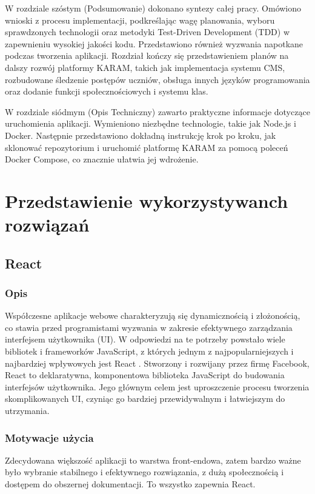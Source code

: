 \documentclass[shortabstract,inz]{iithesis}
\begin{document}
W rozdziale szóstym (Podsumowanie) dokonano syntezy całej pracy. Omówiono wnioski z procesu implementacji, podkreślając wagę planowania, wyboru sprawdzonych technologii oraz metodyki Test-Driven Development (TDD) w zapewnieniu wysokiej jakości kodu. Przedstawiono również wyzwania napotkane podczas tworzenia aplikacji. Rozdział kończy się przedstawieniem planów na dalszy rozwój platformy KARAM, takich jak implementacja systemu CMS, rozbudowane śledzenie postępów uczniów, obsługa innych języków programowania oraz dodanie funkcji społecznościowych i systemu klas.

W rozdziale siódmym (Opis Techniczny) zawarto praktyczne informacje dotyczące uruchomienia aplikacji. Wymieniono niezbędne technologie, takie jak Node.js i Docker. Następnie przedstawiono dokładną instrukcję krok po kroku, jak sklonować repozytorium i uruchomić platformę KARAM za pomocą poleceń Docker Compose, co znacznie ułatwia jej wdrożenie.

\chapter{Przedstawienie wykorzystywanch rozwiązań}

\section{React}
\subsection{Opis}
Współczesne aplikacje webowe charakteryzują się dynamicznością i złożonością, co stawia przed programistami wyzwania w zakresie efektywnego zarządzania interfejsem użytkownika (UI). W odpowiedzi na te potrzeby powstało wiele bibliotek i frameworków JavaScript, z których jednym z najpopularniejszych i najbardziej wpływowych jest React \cite{bib:react}. Stworzony i rozwijany przez firmę Facebook, React to deklaratywna, komponentowa biblioteka JavaScript do budowania interfejsów użytkownika. Jego głównym celem jest uproszczenie procesu tworzenia skomplikowanych UI, czyniąc go bardziej przewidywalnym i łatwiejszym do utrzymania.
\subsection{Motywacje użycia}
Zdecydowana większość aplikacji to warstwa front-endowa, zatem bardzo ważne było wybranie stabilnego i efektywnego rozwiązania, z dużą społecznością i dostępem do obszernej dokumentacji. To wszystko zapewnia React.
\end{document}
